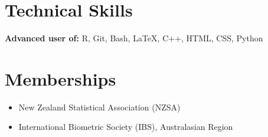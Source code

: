 \documentclass[10pt,a4paper]{moderncv}
\begin{document}

\section{Technical Skills}

\vspace{6pt}
\textbf{Advanced user of:} R, Git, Bash, \LaTeX, C++, HTML, CSS, Python

\section{Memberships}

\vspace{6pt}
\begin{itemize}
\item New Zealand Statistical Association (NZSA)
\item International Biometric Society (IBS), Australasian Region
\end{itemize}
\end{document}
